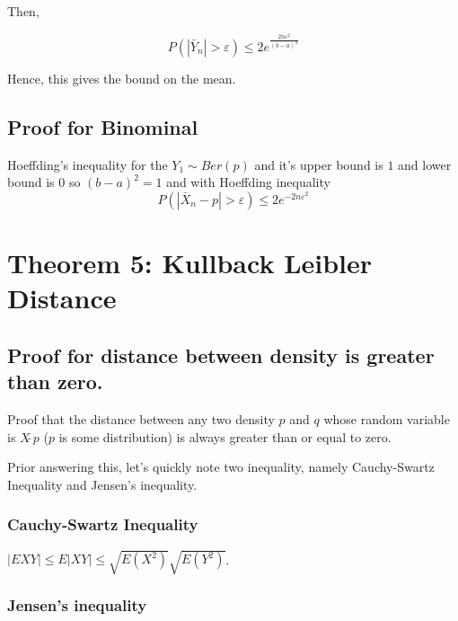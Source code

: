\documentclass[
]{article}
\begin{document}
Then,

\[P\left( \left| {{{\bar{Y}}}_{n}} \right|>\varepsilon  \right)\le 2{{e}^{\frac{2n{{\varepsilon }^{2}}}{{{\left( b-a \right)}^{2}}}}}\]

Hence, this gives the bound on the mean.

\hypertarget{proof-for-binominal}{%
\subsection{Proof for Binominal}\label{proof-for-binominal}}

Hoeffding's inequality for the \({{Y}_{1}}\sim Ber\left( p \right)\) and
it's upper bound is \(1\) and lower bound is \(0\) so
\({{\left( b-a \right)}^{2}}=1\) and with Hoeffding inequality
\[P\left( \left| {{{\bar{X}}}_{n}}-p \right|>\varepsilon  \right)\le 2{{e}^{-2n{{\varepsilon }^{2}}}}\]

\hypertarget{theorem-5-kullback-leibler-distance}{%
\section{Theorem 5: Kullback Leibler
Distance}\label{theorem-5-kullback-leibler-distance}}

\hypertarget{proof-for-distance-between-density-is-greater-than-zero.}{%
\subsection{Proof for distance between density is greater than
zero.}\label{proof-for-distance-between-density-is-greater-than-zero.}}

Proof that the distance between any two density \(p\) and \(q\) whose
random variable is \(X\tilde{\ }p\) (\(p\) is some distribution) is
always greater than or equal to zero.

Prior answering this, let's quickly note two inequality, namely
Cauchy-Swartz Inequality and Jensen's inequality.

\hypertarget{cauchy-swartz-inequality}{%
\subsubsection{Cauchy-Swartz
Inequality}\label{cauchy-swartz-inequality}}

\(\left| EXY \right|\le E\left| XY \right|\le \sqrt{E\left( {{X}^{2}} \right)}\sqrt{E\left( {{Y}^{2}} \right)}\).

\hypertarget{jensens-inequality}{%
\subsubsection{Jensen's inequality}\label{jensens-inequality}}
\end{document}
